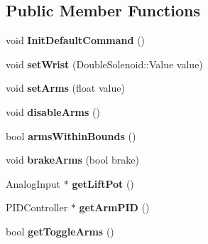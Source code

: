 \subsection*{Public Member Functions}
\begin{DoxyCompactItemize}
\item 
\hypertarget{class_can_collecterino_a25f7c7e5898c30724ae1bf47a7b38e10}{}void {\bfseries Init\+Default\+Command} ()\label{class_can_collecterino_a25f7c7e5898c30724ae1bf47a7b38e10}

\item 
\hypertarget{class_can_collecterino_ad4bc24180183af56a07a93060c0d2743}{}void {\bfseries set\+Wrist} (Double\+Solenoid\+::\+Value value)\label{class_can_collecterino_ad4bc24180183af56a07a93060c0d2743}

\item 
\hypertarget{class_can_collecterino_a2335715a8e197011cfd483302011f8e8}{}void {\bfseries set\+Arms} (float value)\label{class_can_collecterino_a2335715a8e197011cfd483302011f8e8}

\item 
\hypertarget{class_can_collecterino_a60a79346dbaf1d987aba9ef2c950afb4}{}void {\bfseries disable\+Arms} ()\label{class_can_collecterino_a60a79346dbaf1d987aba9ef2c950afb4}

\item 
\hypertarget{class_can_collecterino_adc9e17256b4a00fede2ed7762aeb03c6}{}bool {\bfseries arms\+Within\+Bounds} ()\label{class_can_collecterino_adc9e17256b4a00fede2ed7762aeb03c6}

\item 
\hypertarget{class_can_collecterino_afceae0f9c91f4301137d8e2904e11ae8}{}void {\bfseries brake\+Arms} (bool brake)\label{class_can_collecterino_afceae0f9c91f4301137d8e2904e11ae8}

\item 
\hypertarget{class_can_collecterino_a0eff9a330a430c233b5ae7f72ec13d8b}{}Analog\+Input $\ast$ {\bfseries get\+Lift\+Pot} ()\label{class_can_collecterino_a0eff9a330a430c233b5ae7f72ec13d8b}

\item 
\hypertarget{class_can_collecterino_ad955ee01debe943bf9e749a5bee0b9ef}{}P\+I\+D\+Controller $\ast$ {\bfseries get\+Arm\+P\+I\+D} ()\label{class_can_collecterino_ad955ee01debe943bf9e749a5bee0b9ef}

\item 
\hypertarget{class_can_collecterino_a923a76084bdec56e4e7ad7f8da0842ad}{}bool {\bfseries get\+Toggle\+Arms} ()\label{class_can_collecterino_a923a76084bdec56e4e7ad7f8da0842ad}


\end{DoxyCompactItemize}
